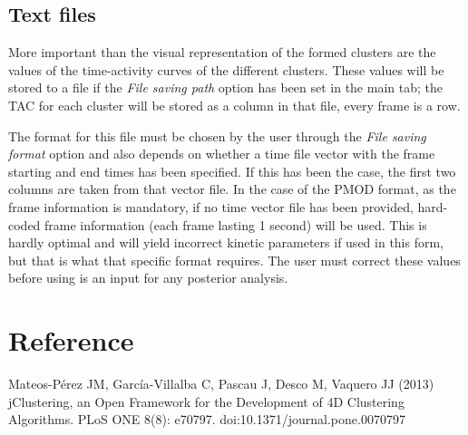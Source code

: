 \documentclass[11pt]{article} %
\begin{document}
\subsection{Text files}
\label{subsec:results_text}

More important than the visual representation of the formed clusters are the values of the time-activity curves of the different
clusters. These values will be stored to a file if the {\em File saving path} option has been set in the main tab; the TAC for
each cluster will be stored as a column in that file, every frame is a row.

The format for this file must be chosen by the user through the {\em File saving format} option and also depends on whether
a time file vector with the frame starting and end times has been specified. If this has been the case, the first two columns
are taken from that vector file. In the case of the PMOD format, as the frame information is mandatory, if no time vector file
has been provided, hard-coded frame information (each frame lasting 1 second) will be used. This is hardly optimal and will yield incorrect kinetic parameters if used in this form, but that is what that specific format requires. The user must correct these values before using is an input for any posterior analysis.

\section{Reference}
\label{sec:reference}

Mateos-Pérez JM, García-Villalba C, Pascau J, Desco M, Vaquero JJ (2013) jClustering, an Open Framework for the Development of 4D Clustering Algorithms. PLoS ONE 8(8): e70797. doi:10.1371/journal.pone.0070797 
\end{document}
